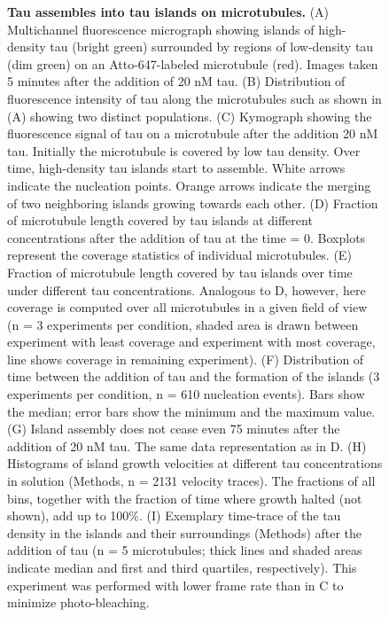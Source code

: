 \begin{figure}[t!]
\caption[Tau assembles into tau islands on microtubules.]{\textbf{Tau assembles into tau islands on microtubules.} (A) Multichannel fluorescence micrograph showing islands of high-density tau (bright green) surrounded by regions of low-density tau (dim green) on an Atto-647-labeled microtubule (red). Images taken 5 minutes after the addition of 20 nM tau. (B) Distribution of fluorescence intensity of tau along the microtubules such as shown in (A) showing two distinct populations. (C) Kymograph showing the fluorescence signal of tau on a microtubule after the addition 20 nM tau. Initially the microtubule is covered by low tau density. Over time, high-density tau islands start to assemble. White arrows indicate the nucleation points. Orange arrows indicate the merging of two neighboring islands growing towards each other. (D) Fraction of microtubule length covered by tau islands at different concentrations after the addition of tau at the time = 0. Boxplots represent the coverage statistics of individual microtubules. (E) Fraction of microtubule length covered by tau islands over time under different tau concentrations. Analogous to D, however, here coverage is computed over all microtubules in a given field of view (n = 3 experiments per condition, shaded area is drawn between experiment with least coverage and experiment with most coverage, line shows coverage in remaining experiment). (F) Distribution of time between the addition of tau and the formation of the islands (3 experiments per condition, n = 610 nucleation events). Bars show the median; error bars show the minimum and the maximum value. (G) Island assembly does not cease even 75 minutes after the addition of 20 nM tau. The same data representation as in D. (H) Histograms of island growth velocities at different tau concentrations in solution (Methods, n = 2131 velocity traces). The fractions of all bins, together with the fraction of time where growth halted (not shown), add up to 100\%. (I) Exemplary time-trace of the tau density in the islands and their surroundings (Methods) after the addition of tau (n = 5 microtubules; thick lines and shaded areas indicate median and first and third quartiles, respectively). This experiment was performed with lower frame rate than in C to minimize photo-bleaching.
	}\label{tauGROW}
\end{figure}

